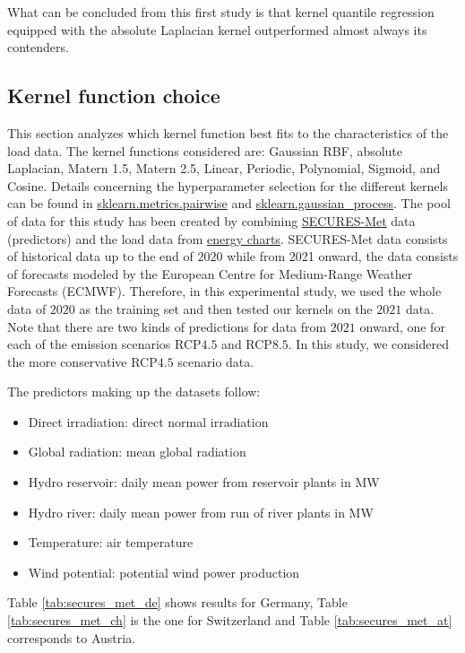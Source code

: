 What can be concluded from this first study is that kernel quantile regression equipped with the absolute Laplacian kernel outperformed almost always its contenders.

\subsection{Kernel function choice}
This section analyzes which kernel function best fits to the characteristics of the load data.
The kernel functions considered are: Gaussian RBF, absolute Laplacian, Matern 1.5, Matern 2.5, Linear, Periodic, Polynomial, Sigmoid, and Cosine. 
Details concerning the hyperparameter selection for the different kernels can be found in \href{https://scikit-learn.org/stable/modules/classes.html#module-sklearn.metrics.pairwise}{sklearn.metrics.pairwise} and \href{https://scikit-learn.org/stable/modules/classes.html#module-sklearn.gaussian_process}{sklearn.gaussian\_process}.
The pool of data for this study has been created by combining \href{https://zenodo.org/records/7907883}{SECURES-Met} data (predictors) \cite{Formayer2023} and the load data from \href{https://www.energy-charts.info/index.html?l=en&c=DE}{energy charts}.
SECURES-Met data consists of historical data up to the end of $2020$ while from 2021 onward, the data consists of forecasts modeled by the European Centre for Medium-Range Weather Forecasts (ECMWF).
Therefore, in this experimental study, we used the whole data of $2020$ as the training set and then tested our kernels on the $2021$ data.
Note that there are two kinds of predictions for data from $2021$ onward, one for each of the emission scenarios RCP$4.5$ and RCP$8.5$. In this study, we considered the more conservative RCP$4.5$ scenario data.

The predictors making up the datasets follow:
\begin{itemize}
    \item Direct irradiation: direct normal irradiation
    \item Global radiation: mean global radiation
    \item Hydro reservoir: daily mean power from reservoir plants in MW
    \item Hydro river: daily mean power from run of river plants in MW
    \item Temperature: air temperature
    \item Wind potential: potential wind power production
\end{itemize}
Table \ref{tab:secures_met_de} shows results for Germany, Table \ref{tab:secures_met_ch} is the one for Switzerland and Table \ref{tab:secures_met_at} corresponds to Austria.


